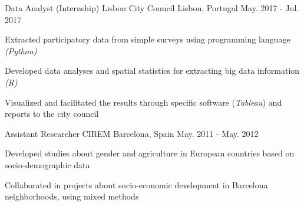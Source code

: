 \begin{cventries}
 \cventry
   {Data Analyst (Internship)} %
   {Lisbon City Council} %
   {Lisbon, Portugal} %
   {May. 2017 - Jul. 2017} %
    {
      \begin{cvitems} %
        \item {Extracted participatory data from simple surveys using programming language \textit{(Python)}}
        \item {Developed data analyses and spatial statistics for extracting big data information \textit{(R)}}
        \item {Visualized and facilitated the results through specific software (\textit{Tableau}) and reports to the city council}
      \end{cvitems}
    }


  \cventry
    {Assistant Researcher} %
    {CIREM} %
    {Barcelona, Spain} %
    {May. 2011 - May. 2012} %
    {
      \begin{cvitems} %
        \item {Developed studies about gender and agriculture in European countries based on socio-demographic data}
        \item {Collaborated in projects about socio-economic development in Barcelona neighborhoods, using mixed methods}
      \end{cvitems}
    }
\end{cventries}
